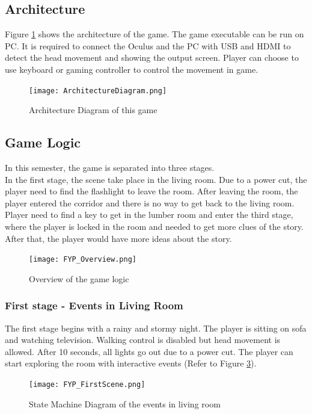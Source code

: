 \documentclass{article}
\begin{document}
\subsection{Architecture}
Figure \ref{fig:ArchitectureDiagram} shows the architecture  of the game. The game executable can be run on PC. It is required to connect the Oculus and the PC with USB and HDMI to detect the head movement and showing the output screen. Player can choose to use keyboard or gaming controller to control the movement in game.
\bigskip
\begin{figure}[hp!]
\centering
\texttt{[image: ArchitectureDiagram.png]}
\caption{Architecture Diagram of this game}
\label{fig:ArchitectureDiagram}
\end{figure}

\newpage
\subsection{Game Logic}
In this semester, the game is separated into three stages.\\
In the first stage, the scene take place in the living room. Due to a power cut, the player need to find the flashlight to leave the room. After leaving the room, the player entered the corridor and there is no way to get back to the living room. Player need to find a key to get in the lumber room and enter the third stage, where the player is locked in the room and needed to get more clues of the story. After that, the player would have more ideas about the story. \par
\bigskip
\begin{figure}[hp!]
\centering
\texttt{[image: FYP\_Overview.png]}
\caption{Overview of the game logic}
\label{fig:FYP_Overview}
\end{figure}
\clearpage

\subsubsection{First stage - Events in Living Room}
The first stage begins with a rainy and stormy night. The player is sitting on sofa and watching television. Walking control is disabled but head movement is allowed. After 10 seconds, all lights go out due to a power cut. The player can start exploring the room with interactive events (Refer to Figure \ref{fig:FYP_FirstScene}). \par
\bigskip

\begin{figure}[hp!]
\centering
\texttt{[image: FYP\_FirstScene.png]}
\caption{State Machine Diagram of the events in living room}
\label{fig:FYP_FirstScene}
\end{figure}
\end{document}
